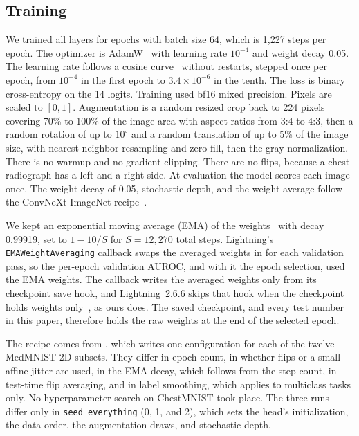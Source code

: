 \documentclass[conference]{IEEEtran}
\newif\ifanycitation
\let\citeAnyKey\cite
\renewcommand{\cite}{\global\anycitationtrue\citeAnyKey}
\begin{document}
\subsection{Training}

We trained all layers for \epochs{} epochs with batch size 64, which is 1,227 steps per
epoch. The optimizer is AdamW~\cite{loshchilov2019adamw} with learning rate $10^{-4}$ and
weight decay 0.05. The learning rate follows a cosine curve~\cite{loshchilov2017sgdr}
without restarts, stepped once per epoch, from $10^{-4}$ in the first epoch to
$3.4\times10^{-6}$ in the tenth. The loss is binary cross-entropy on the 14 logits.
Training used bf16 mixed precision. Pixels are scaled to $[0,1]$. Augmentation is a random resized crop
back to 224 pixels covering 70\% to 100\% of the image area with aspect ratios from 3:4 to
4:3, then a random rotation of up to $10^\circ$ and a random translation of up to 5\% of
the image size, with nearest-neighbor resampling and zero fill, then the gray
normalization. There is no warmup and no gradient clipping. There are no flips, because a chest radiograph has a left and a right side.
At evaluation the model scores each image once. The weight decay of 0.05, stochastic
depth, and the weight average follow the ConvNeXt ImageNet recipe~\cite{liu2022convnext}.

We kept an exponential moving average (EMA) of the weights~\cite{polyak1992averaging}
with decay 0.99919, set to $1-10/S$ for $S=12{,}270$ total steps. Lightning's
\texttt{EMAWeightAveraging} callback swaps the averaged weights in for each validation
pass, so the per-epoch validation AUROC, and with it the epoch selection, used the EMA
weights. The callback writes the averaged weights only from its checkpoint save hook, and
Lightning~2.6.6 skips that hook when the checkpoint holds weights
only~\cite{lightning266checkpoint}, as ours does. The saved checkpoint, and every test
number in this paper, therefore holds the raw weights at the end of the selected epoch.

The recipe comes from , which writes one configuration
for each of the twelve MedMNIST 2D subsets. They differ in epoch count, in whether flips or
a small affine jitter are used, in the EMA decay, which follows from the step count, in
test-time flip averaging, and in label smoothing, which applies to multiclass tasks only.
No hyperparameter search on ChestMNIST took place. The three runs differ only in
\texttt{seed\_everything} (0, 1, and 2), which sets the head's initialization, the data
order, the augmentation draws, and stochastic depth.
\end{document}
